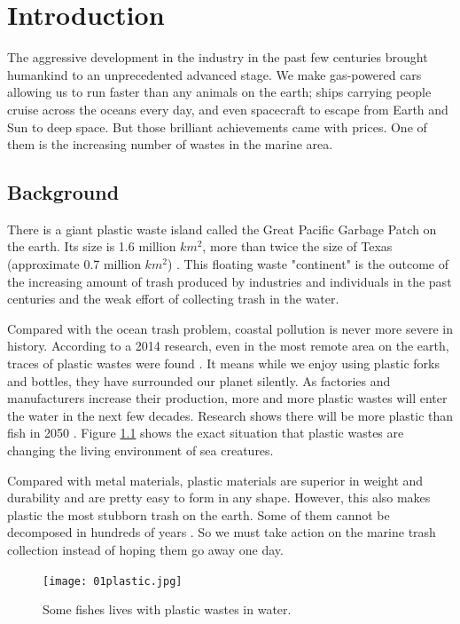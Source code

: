 \chapter{Introduction}

The aggressive development in the industry in the past few centuries brought humankind to an unprecedented advanced stage. We make gas-powered cars allowing us to run faster than any animals on the earth; ships carrying people cruise across the oceans every day, and even spacecraft to escape from Earth and Sun to deep space. But those brilliant achievements came with prices. One of them is the increasing number of wastes in the marine area.

\section{Background} \label{sec:background}

There is a giant plastic waste island called the Great Pacific Garbage Patch on the earth. Its size is 1.6 million $km^2$, more than twice the size of Texas (approximate 0.7 million $km^2$) \cite{Lebreton2018}. This floating waste "continent" is the outcome of the increasing amount of trash produced by industries and individuals in the past centuries and the weak effort of collecting trash in the water.

Compared with the ocean trash problem, coastal pollution is never more severe in history. According to a 2014 research, even in the most remote area on the earth, traces of plastic wastes were found \cite{Cozar10239}. It means while we enjoy using plastic forks and bottles, they have surrounded our planet silently. As factories and manufacturers increase their production, more and more plastic wastes will enter the water in the next few decades. Research shows there will be more plastic than fish in 2050 \cite{agenda2016new}. Figure \ref{fig:01plastic} shows the exact situation that plastic wastes are changing the living environment of sea creatures.

Compared with metal materials, plastic materials are superior in weight and durability and are pretty easy to form in any shape. However, this also makes plastic the most stubborn trash on the earth. Some of them cannot be decomposed in hundreds of years \cite{acssuschemeng.9b06635}. So we must take action on the marine trash collection instead of hoping them go away one day.

\begin{figure}[ht]
    \centering
    \texttt{[image: 01plastic.jpg]}
    \caption{Some fishes lives with plastic wastes in water.}
    \label{fig:01plastic}
\end{figure}

